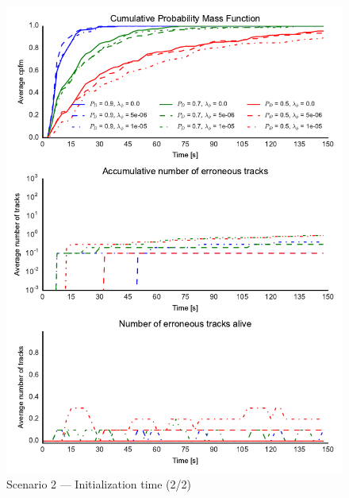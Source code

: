 \begin{figure}
\centering
\includegraphics{Figures/plots/Scenario2_Init-Time(2-2).pdf}
\caption{Scenario 2 --- Initialization time (2/2)}\label{fig:init2_time_2-2}
\end{figure}

